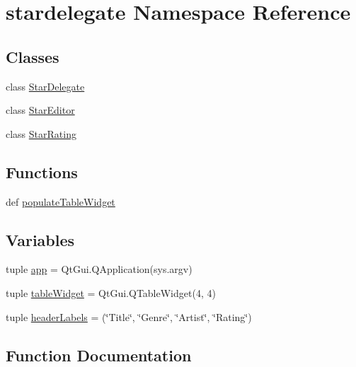\hypertarget{namespacestardelegate}{}\section{stardelegate Namespace Reference}
\label{namespacestardelegate}
\subsection*{Classes}
\begin{DoxyCompactItemize}
\item 
class \hyperlink{classstardelegate_1_1StarDelegate}{Star\+Delegate}
\item 
class \hyperlink{classstardelegate_1_1StarEditor}{Star\+Editor}
\item 
class \hyperlink{classstardelegate_1_1StarRating}{Star\+Rating}
\end{DoxyCompactItemize}
\subsection*{Functions}
\begin{DoxyCompactItemize}
\item 
def \hyperlink{namespacestardelegate_aeca07877023901fa5f52782cbe9c9795}{populate\+Table\+Widget}
\end{DoxyCompactItemize}
\subsection*{Variables}
\begin{DoxyCompactItemize}
\item 
tuple \hyperlink{namespacestardelegate_a90a3c6101a7c7a4f8a32b85dc3ba9f1f}{app} = Qt\+Gui.\+Q\+Application(sys.\+argv)
\item 
tuple \hyperlink{namespacestardelegate_a7c1826972de94403170de63700ed443e}{table\+Widget} = Qt\+Gui.\+Q\+Table\+Widget(4, 4)
\item 
tuple \hyperlink{namespacestardelegate_a4b4d6514db6bdc14104d7d6d34e9fd85}{header\+Labels} = (\char`\"{}Title\char`\"{}, \char`\"{}Genre\char`\"{}, \char`\"{}Artist\char`\"{}, \char`\"{}Rating\char`\"{})
\end{DoxyCompactItemize}


\subsection{Function Documentation}
\hypertarget{namespacestardelegate_aeca07877023901fa5f52782cbe9c9795}{}
